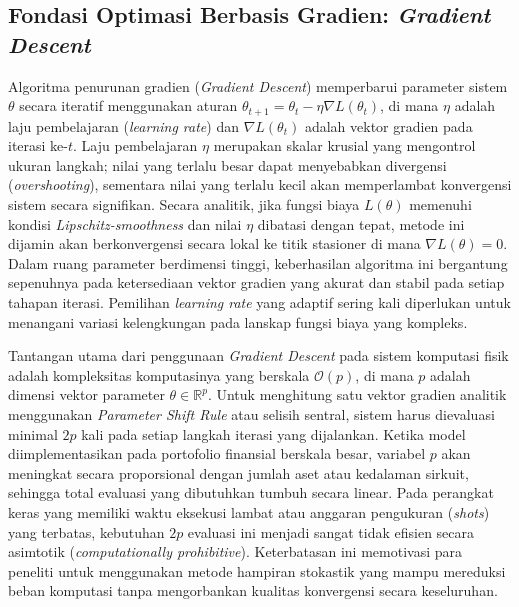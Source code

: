 \subsection{Fondasi Optimasi Berbasis Gradien: \textit{Gradient Descent}}
Algoritma penurunan gradien (\textit{Gradient Descent}) memperbarui parameter sistem $\theta$ secara iteratif menggunakan aturan $\theta_{t+1} = \theta_t - \eta \nabla L(\theta_t)$, di mana $\eta$ adalah laju pembelajaran (\textit{learning rate}) dan $\nabla L(\theta_t)$ adalah vektor gradien pada iterasi ke-$t$. Laju pembelajaran $\eta$ merupakan skalar krusial yang mengontrol ukuran langkah; nilai yang terlalu besar dapat menyebabkan divergensi (\textit{overshooting}), sementara nilai yang terlalu kecil akan memperlambat konvergensi sistem secara signifikan. Secara analitik, jika fungsi biaya $L(\theta)$ memenuhi kondisi \textit{Lipschitz-smoothness} dan nilai $\eta$ dibatasi dengan tepat, metode ini dijamin akan berkonvergensi secara lokal ke titik stasioner di mana $\nabla L(\theta) = 0$. Dalam ruang parameter berdimensi tinggi, keberhasilan algoritma ini bergantung sepenuhnya pada ketersediaan vektor gradien yang akurat dan stabil pada setiap tahapan iterasi. Pemilihan \textit{learning rate} yang adaptif sering kali diperlukan untuk menangani variasi kelengkungan pada lanskap fungsi biaya yang kompleks.

Tantangan utama dari penggunaan \textit{Gradient Descent} pada sistem komputasi fisik adalah kompleksitas komputasinya yang berskala $\mathcal{O}(p)$, di mana $p$ adalah dimensi vektor parameter $\theta \in \mathbb{R}^p$. Untuk menghitung satu vektor gradien analitik menggunakan \textit{Parameter Shift Rule} atau selisih sentral, sistem harus dievaluasi minimal $2p$ kali pada setiap langkah iterasi yang dijalankan. Ketika model diimplementasikan pada portofolio finansial berskala besar, variabel $p$ akan meningkat secara proporsional dengan jumlah aset atau kedalaman sirkuit, sehingga total evaluasi yang dibutuhkan tumbuh secara linear. Pada perangkat keras yang memiliki waktu eksekusi lambat atau anggaran pengukuran (\textit{shots}) yang terbatas, kebutuhan $2p$ evaluasi ini menjadi sangat tidak efisien secara asimtotik (\textit{computationally prohibitive}). Keterbatasan ini memotivasi para peneliti untuk menggunakan metode hampiran stokastik yang mampu mereduksi beban komputasi tanpa mengorbankan kualitas konvergensi secara keseluruhan.

